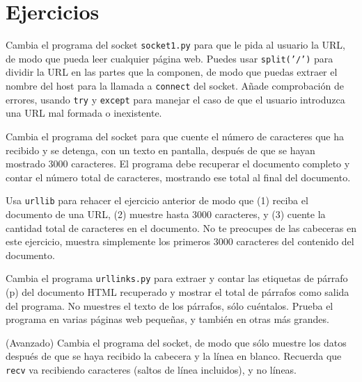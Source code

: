 \section{Ejercicios}

\begin{ex}
Cambia el programa del socket {\tt socket1.py} para que le pida al usuario
la URL, de modo que pueda leer cualquier página web.
Puedes usar {\tt split('/')} para dividir la URL en las partes que la componen,
de modo que puedas extraer el nombre del host para la llamada a {\tt connect} del socket.
Añade comprobación de errores, usando {\tt try} y {\tt except} para manejar el caso de que
el usuario introduzca una URL mal formada o inexistente.  
\end{ex}

\begin{ex}
Cambia el programa del socket para que cuente el número de caracteres que ha recibido
y se detenga, con un texto en pantalla, después de que se hayan mostrado 3000 caracteres. El programa
debe recuperar el documento completo y contar el número total de caracteres,
mostrando ese total al final del documento.
\end{ex}

\begin{ex}
Usa {\tt urllib} para rehacer el ejercicio anterior de modo que (1) reciba el documento
de una URL, (2) muestre hasta 3000 caracteres, y (3) cuente la cantidad total
de caracteres en el documento. No te preocupes de las cabeceras en este ejercicio,
muestra simplemente los primeros 3000 caracteres del contenido del documento.
\end{ex}

\begin{ex}
Cambia el programa {\tt urllinks.py} para extraer y contar
las etiquetas de párrafo (p) del documento HTML recuperado y
mostrar el total de párrafos como
salida del programa.
No muestres el texto de los párrafos, sólo cuéntalos.
Prueba el programa en varias páginas web pequeñas,
y también en otras más grandes.
\end{ex}

\begin{ex}
(Avanzado) Cambia el programa del socket, de modo que sólo muestre los datos
después de que se haya recibido la cabecera y la línea en blanco. Recuerda que {\tt recv}
va recibiendo caracteres (saltos de línea incluidos), y no líneas.
\end{ex}


